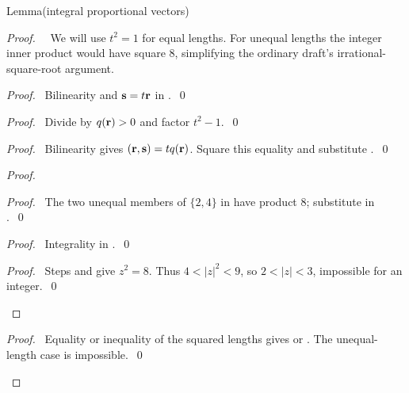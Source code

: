 \begin{mergedproofsection}
\begin{namedresult}{Lemma}{(integral proportional vectors)}\label{lem:312-proportional}
\end{namedresult}
\begin{proof}
\pfsketch\ \new\ We will use $t^2=1$ for equal lengths. For unequal
lengths the integer inner product would have square 8, simplifying
the ordinary draft's irrational-square-root argument.
\begin{proof}\pf\ Bilinearity and ${\mathbf s}=t{\mathbf r}$ in .~\qed\end{proof}
\begin{proof}\pf\ Divide  by $q({\mathbf r})>0$ and
factor $t^2-1$.~\qed\end{proof}
\begin{proof}\pf\ Bilinearity gives $({\mathbf r},{\mathbf s})=tq({\mathbf r})$.
Square this equality and substitute .~\qed\end{proof}
\begin{proof}
 \begin{proof}\pf\ The two unequal members of $\{2,4\}$ in 
 have product 8; substitute in .~\qed\end{proof}
 \begin{proof}\pf\ Integrality in .~\qed\end{proof}
 \qedstep
 \begin{proof}\pf\ Steps  and
  give $z^2=8$. Thus $4<|z|^2<9$, so
 $2<|z|<3$, impossible for an integer.~\qed\end{proof}
\end{proof}
\qedstep
\begin{proof}\pf\ Equality or inequality of the squared lengths gives
 or .
The unequal-length case is impossible.~\qed\end{proof}
\end{proof}


\end{mergedproofsection}
